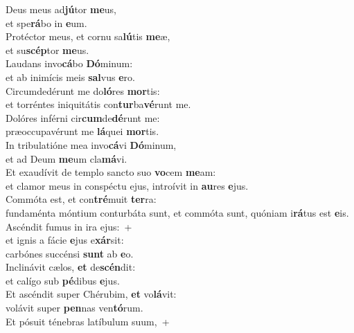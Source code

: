 \evenverse Deus meus ad\textbf{jú}tor \textbf{me}us,~\*\\
\evenverse et spe\textbf{rá}bo in \textbf{e}um.\\
\oddverse Protéctor meus, et cornu sa\textbf{lú}tis \textbf{me}æ,~\*\\
\oddverse et su\textbf{scép}tor \textbf{me}us.\\
\evenverse Laudans invo\textbf{cá}bo \textbf{Dó}minum:~\*\\
\evenverse et ab inimícis meis \textbf{sal}vus \textbf{e}ro.\\
\oddverse Circumdedérunt me do\textbf{ló}res \textbf{mor}tis:~\*\\
\oddverse et torréntes iniquitátis con\textbf{tur}ba\textbf{vé}runt me.\\
\evenverse Dolóres inférni cir\textbf{cum}de\textbf{dé}runt me:~\*\\
\evenverse præoccupavérunt me \textbf{lá}quei \textbf{mor}tis.\\
\oddverse In tribulatióne mea invo\textbf{cá}vi \textbf{Dó}minum,~\*\\
\oddverse et ad Deum \textbf{me}um cla\textbf{má}vi.\\
\evenverse Et exaudívit de templo sancto suo \textbf{vo}cem \textbf{me}am:~\*\\
\evenverse et clamor meus in conspéctu ejus, introívit in \textbf{au}res \textbf{e}jus.\\
\oddverse Commóta est, et con\textbf{tré}muit \textbf{ter}ra:~\*\\
\oddverse fundaménta móntium conturbáta sunt, et commóta sunt, quóniam i\textbf{rá}tus est \textbf{e}is.\\
\evenverse Ascéndit fumus in ira ejus:~+\\
\evenverse  et ignis a fácie \textbf{e}jus e\textbf{xár}sit:~\*\\
\evenverse carbónes succénsi \textbf{sunt} ab \textbf{e}o.\\
\oddverse Inclinávit cælos, \textbf{et} de\textbf{scén}dit:~\*\\
\oddverse et calígo sub \textbf{pé}dibus \textbf{e}jus.\\
\evenverse Et ascéndit super Chérubim, \textbf{et} vo\textbf{lá}vit:~\*\\
\evenverse volávit super \textbf{pen}nas ven\textbf{tó}rum.\\
\oddverse Et pósuit ténebras latíbulum suum,~+\\
